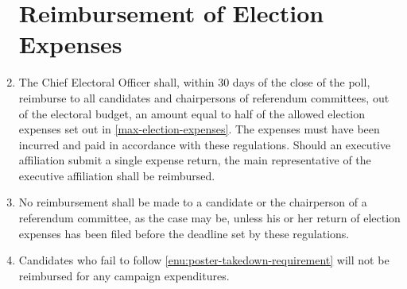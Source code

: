 \documentclass[oneside]{book}
\begin{document}
\begin{enumerate}
\section{\label{Reimbursement_of_Election_Expenses}Reimbursement of Election
Expenses }
\item The Chief Electoral Officer shall, within 30 days of the close of
the poll, reimburse to all candidates and chairpersons of referendum
committees, out of the electoral budget, an amount equal to half of
the allowed election expenses set out in \autoref{max-election-expenses}.
The expenses must have been incurred and paid in accordance with these
regulations. Should an executive affiliation submit a single expense
return, the main representative of the executive affiliation shall
be reimbursed. 
\item No reimbursement shall be made to a candidate or the chairperson of
a referendum committee, as the case may be, unless his or her return
of election expenses has been filed before the deadline set by these
regulations. 
\item Candidates who fail to follow \autoref{enu:poster-takedown-requirement}
will not be reimbursed for any campaign expenditures. 


\end{enumerate}
\end{document}
